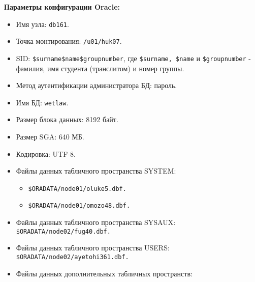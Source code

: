 \documentclass[12pt, a4paper]{article}
\begin{document}
	\textbf{Параметры конфигурации Oracle:}\\
	\begin{itemize}
		\item Имя узла: \texttt{db161}.
		\item Точка монтирования: \texttt{/u01/huk07}.
		\item SID: \texttt{\$surname\$name\$groupnumber}, где \texttt{\$surname, \$name} и \texttt{\$groupnumber} - фамилия, имя студента (транслитом) и номер группы.
		\item Метод аутентификации администратора БД: пароль.
		\item Имя БД: \texttt{wetlaw}.
		\item Размер блока данных: 8192 байт.
		\item Размер SGA: 640 МБ.
		\item Кодировка: UTF-8.
		\item Файлы данных табличного пространства SYSTEM:
		\begin{itemize}
			\item \texttt{\$ORADATA/node01/oluke5.dbf.}
			\item \texttt{\$ORADATA/node01/omozo48.dbf.}
		\end{itemize}
		\item Файлы данных табличного пространства SYSAUX:
		\texttt{\$ORADATA/node02/fug40.dbf.}
		\item Файлы данных табличного пространства USERS:
		\texttt{\$ORADATA/node02/ayetohi361.dbf.}
		\item Файлы данных дополнительных табличных пространств:
	\end{itemize}
\end{document}
